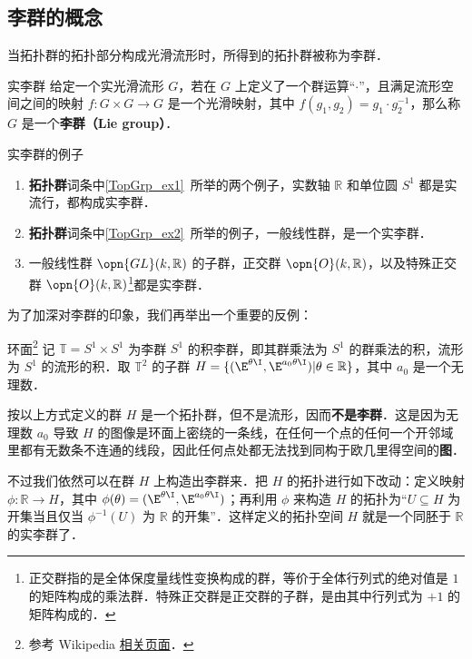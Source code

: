 

\begin{issues}
\issueDraft
\end{issues}


\subsection{李群的概念}

当拓扑群的拓扑部分构成光滑流形时，所得到的拓扑群被称为李群．

\begin{definition}{实李群}\label{LieGrp_def1}
给定一个实光滑流形 $G$，若在 $G$ 上定义了一个群运算“$\cdot$”，且满足流形空间之间的映射 $f:G\times G\rightarrow G$ 是一个光滑映射，其中 $f(g_1, g_2)=g_1\cdot g_2^{-1}$，那么称 $G$ 是一个\textbf{李群（Lie group）}．
\end{definition}

\begin{example}{实李群的例子}
\begin{enumerate}
\item \textbf{拓扑群}词条中\autoref{TopGrp_ex1}~所举的两个例子，实数轴 $\mathbb{R}$ 和单位圆 $S^1$ 都是实流行，都构成实李群．
\item \textbf{拓扑群}词条中\autoref{TopGrp_ex2}~所举的例子，一般线性群，是一个实李群．
\item 一般线性群 $\opn{GL}(k, \mathbb{R})$ 的子群，正交群 $\opn{O}(k, \mathbb{R})$，以及特殊正交群 $\opn{O}(k, \mathbb{R})$\footnote{正交群指的是全体保度量线性变换构成的群，等价于全体行列式的绝对值是 $1$ 的矩阵构成的乘法群．特殊正交群是正交群的子群，是由其中行列式为 $+1$ 的矩阵构成的．}都是实李群．
\end{enumerate}
\end{example}

为了加深对李群的印象，我们再举出一个重要的反例：

\begin{definition}{环面\footnote{参考 Wikipedia \href{https://en.wikipedia.org/wiki/Lie_group}{相关页面}．}}
记 $\mathbb{T}=S^1\times S^1$ 为李群 $S^1$ 的积李群，即其群乘法为 $S^1$ 的群乘法的积，流形为 $S^1$ 的流形的积．取 $\mathbb{T}^2$ 的子群 $H=\{(\E^{\theta\I}, \E^{a_0\theta\I})|\theta\in\mathbb{R}\}$，其中 $a_0$ 是一个无理数．

按以上方式定义的群 $H$ 是一个拓扑群，但不是流形，因而\textbf{不是李群}．这是因为无理数 $a_0$ 导致 $H$ 的图像是环面上密绕的一条线，在任何一个点的任何一个开邻域里都有无数条不连通的线段，因此任何点处都无法找到同构于欧几里得空间的\textbf{图}．

不过我们依然可以在群 $H$ 上构造出李群来．把 $H$ 的拓扑进行如下改动：定义映射 $\phi:\mathbb{R}\to H$，其中 $\phi(\theta)=(\E^{\theta\I}, \E^{a_0\theta\I})$；再利用 $\phi$ 来构造 $H$ 的拓扑为“$U\subseteq H$ 为开集当且仅当 $\phi^{-1}(U)$ 为 $\mathbb{R}$ 的开集”．这样定义的拓扑空间 $H$ 就是一个同胚于 $\mathbb{R}$ 的实李群了．
\end{definition}


